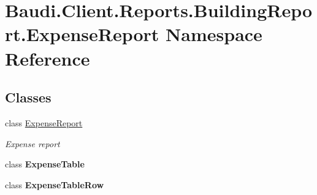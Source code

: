 \hypertarget{namespace_baudi_1_1_client_1_1_reports_1_1_building_report_1_1_expense_report}{}\section{Baudi.\+Client.\+Reports.\+Building\+Report.\+Expense\+Report Namespace Reference}
\label{namespace_baudi_1_1_client_1_1_reports_1_1_building_report_1_1_expense_report}
\subsection*{Classes}
\begin{DoxyCompactItemize}
\item 
class \hyperlink{class_baudi_1_1_client_1_1_reports_1_1_building_report_1_1_expense_report_1_1_expense_report}{Expense\+Report}
\begin{DoxyCompactList}\small\item\em Expense report \end{DoxyCompactList}\item 
class {\bfseries Expense\+Table}
\item 
class {\bfseries Expense\+Table\+Row}
\end{DoxyCompactItemize}
